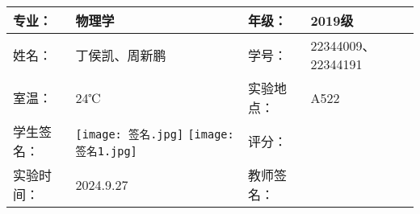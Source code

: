 \documentclass[dvipsnames, svgnames,a4paper,11pt]{article}
\begin{document}
	






\clearpage
\begin{table}
	\renewcommand\arraystretch{1.7}
	\centering
	\begin{tabularx}{\textwidth}{|X|X|X|X|}
	\hline
	专业：& 物理学 &年级：& 2019级 \\
	\hline
	姓名： & 丁侯凯、周新鹏& 学号：&22344009、22344191\\
	\hline
	室温：& 24℃& 实验地点： & A522\\
	\hline
	学生签名：& \texttt{[image: 签名.jpg]}   \texttt{[image: 签名1.jpg]}   & 评分： &\\
	\hline
	实验时间：& 2024.9.27& 教师签名：&\\
	\hline
	\end{tabularx}
\end{table}
\end{document}
